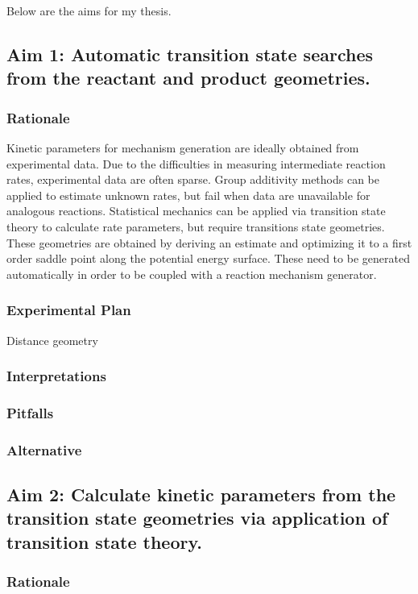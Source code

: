 \documentclass[12pt]{article}
\begin{document}
Below are the aims for my thesis.

\subsection{Aim 1: Automatic transition state searches from the reactant and product geometries.}
\subsubsection{Rationale}

Kinetic parameters for mechanism generation are ideally obtained from experimental data. Due to the difficulties in measuring intermediate reaction rates, experimental data are often sparse. Group additivity methods can be applied to estimate unknown rates, but fail when data are unavailable for analogous reactions. Statistical mechanics can be applied via transition state theory to calculate rate parameters, but require transitions state geometries. These geometries are obtained by deriving an estimate and optimizing it to a first order saddle point along the potential energy surface. These need to be generated automatically in order to be coupled with a reaction mechanism generator.

\subsubsection{Experimental Plan}

Distance geometry 

\subsubsection{Interpretations}
\subsubsection{Pitfalls}
\subsubsection{Alternative}

\subsection{Aim 2: Calculate kinetic parameters from the transition state geometries via application of transition state theory.}
\subsubsection{Rationale}
\end{document}
